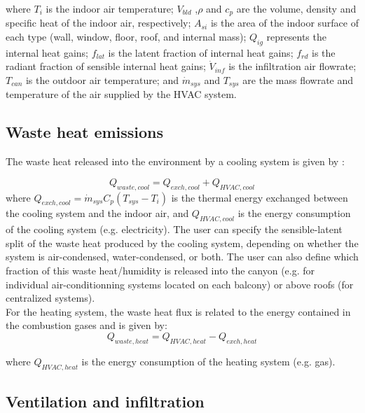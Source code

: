 where $T_i$ is the indoor air temperature; $V_{bld}$ ,$\rho$ and $c_p$ 
are the volume, density and specific heat of the indoor air, respectively;
$A_{si}$ is the area of the indoor surface of each type (wall,  window,  floor, roof, and internal mass);
$Q_{ig}$ represents the internal heat gains; $f_{lat}$ is the latent fraction of internal heat gains;
$f_{rd}$ is the radiant fraction of sensible internal heat gains;
$\dot{V}_{inf}$ is the infiltration air flowrate;
$T_{can}$ is the outdoor air temperature; and
$\dot{m}_{sys}$ and $T_{sys}$ are the mass flowrate and temperature of the air supplied by the HVAC system. \\


\subsection{Waste heat emissions}

The waste heat released into the environment by a cooling system is given by : 

\begin{displaymath}
	Q_{waste, cool} = Q_{exch, cool} + Q_{HVAC, cool}
\end{displaymath}
where $Q_{exch, cool}= \dot{m}_{sys}C_p (T_{sys}-T_{i})$ is the thermal energy exchanged between the cooling system and the indoor air, and $ Q_{HVAC, cool}$ is the energy consumption of the cooling system (e.g. electricity).  The user can specify the sensible-latent split of the waste heat produced by the cooling system, depending on whether the system is air-condensed, water-condensed, or both. The user can also define which fraction of this waste heat/humidity is released into the canyon (e.g. for individual air-conditionning systems located on each balcony) or above roofs (for centralized systems). \\

For the heating system, the waste heat flux is related to the energy contained in the combustion gases and is given by:
\begin{displaymath}
Q_{waste, heat} = Q_{HVAC, heat} - Q_{exch, heat}
\end{displaymath}

where $Q_{HVAC, heat}$ is the energy consumption of the heating system (e.g. gas). \\


\subsection{Ventilation and infiltration}

